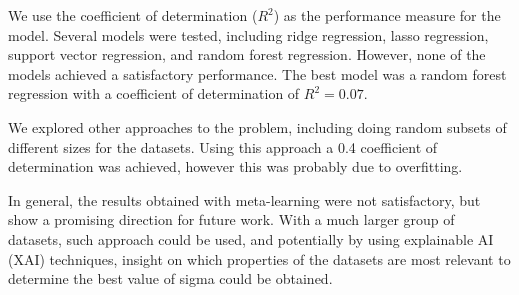 We use the coefficient of determination ($R^2$) as the performance measure
for the model. Several models were tested, including ridge regression, lasso
regression, support vector regression, and random forest regression. However,
none of the models achieved a satisfactory performance. The best model was
a random forest regression with a coefficient of determination of $R^2=0.07$.

We explored other approaches to the problem, including doing random subsets of
different sizes for the datasets. Using this approach a 0.4 coefficient of
determination was achieved, however this was probably due to overfitting.

In general, the results obtained with meta-learning were not satisfactory, but
show a promising direction for future work. With a much larger group of datasets,
such approach could be used, and potentially by using explainable AI (XAI)
techniques, insight on which properties of the datasets are most relevant
to determine the best value of sigma could be obtained.
